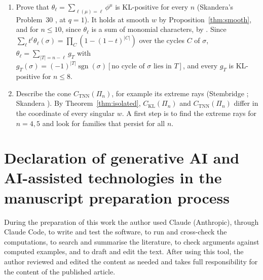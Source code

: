 \documentclass[11pt]{amsart}
\theoremstyle{definition}
\theoremstyle{remark}
\newcommand{\sgn}{\operatorname{sgn}}
\newcommand{\CKL}{C_{\mathrm{KL}}}
\newcommand{\CTNN}{C_{\mathrm{TNN}}}
\begin{document}
\begin{enumerate}
\item\label{prob:theta} Prove that $\theta_\ell=\sum_{\ell(\mu)=\ell}\phi^\mu$ is KL-positive for every $n$ (Skandera's Problem~30 \cite{Ska25}, at $q=1$). It holds at smooth $w$ by Proposition~\ref{thm:smooth}, and for $n\le10$, since $\theta_\ell$ is a sum of monomial characters, by \cite{McN}. Since $\sum_\ell t^\ell\theta_\ell(\sigma)=\prod_{C}(1-(1-t)^{|C|})$ over the cycles $C$ of $\sigma$, $\theta_\ell=\sum_{|T|=n-\ell}g_T$ with $g_T(\sigma)=(-1)^{|T|}\sgn(\sigma)[\text{no cycle of }\sigma\text{ lies in }T]$, and every $g_T$ is KL-positive for $n\le8$.
\item Describe the cone $\CTNN(\Pi_n)$, for example its extreme rays (Stembridge \cite[Question~5.4]{Ste92}; Skandera \cite[Problem~5.8]{Ska08}). By Theorem~\ref{thm:isolated}, $\CKL(\Pi_n)$ and $\CTNN(\Pi_n)$ differ in the coordinate of every singular $w$. A first step is to find the extreme rays for $n=4,5$ and look for families that persist for all $n$.
\end{enumerate}

\section*{Declaration of generative AI and AI-assisted technologies in the manuscript preparation process}
During the preparation of this work the author used Claude (Anthropic), through Claude Code, to write and test the software, to run and cross-check the computations, to search and summarise the literature, to check arguments against computed examples, and to draft and edit the text. After using this tool, the author reviewed and edited the content as needed and takes full responsibility for the content of the published article.
\end{document}
